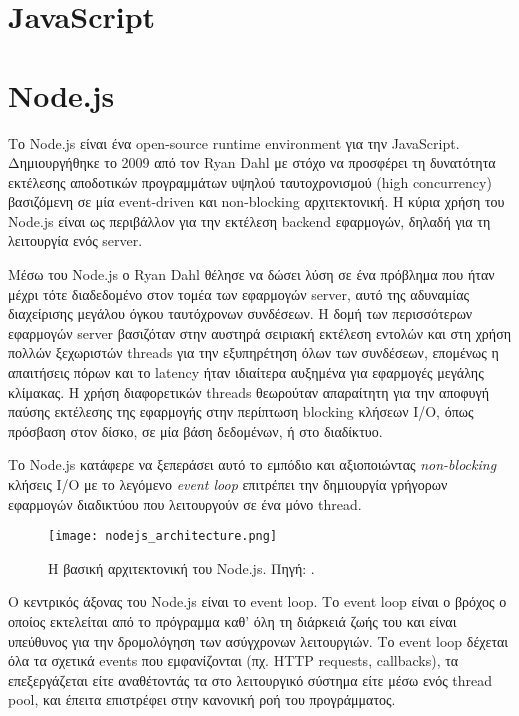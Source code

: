 \documentclass[../thesis.tex]{subfiles}
\begin{document}
\section{JavaScript}


\section{Node.js}

Το Node.js είναι ένα open-source runtime environment για την JavaScript.
Δημιουργήθηκε το 2009 από τον Ryan Dahl με στόχο να προσφέρει τη δυνατότητα εκτέλεσης αποδοτικών προγραμμάτων υψηλού ταυτοχρονισμού (high concurrency) βασιζόμενη σε μία event-driven και non-blocking αρχιτεκτονική\cite{node_presentation,node_slides}.
Η κύρια χρήση του Node.js είναι ως περιβάλλον για την εκτέλεση backend εφαρμογών, δηλαδή για τη λειτουργία ενός server.

\bigskip

Μέσω του Node.js ο Ryan Dahl θέλησε να δώσει λύση σε ένα πρόβλημα που ήταν μέχρι τότε διαδεδομένο στον τομέα των εφαρμογών server, αυτό της αδυναμίας διαχείρισης μεγάλου όγκου ταυτόχρονων συνδέσεων.
Η δομή των περισσότερων εφαρμογών server βασιζόταν στην αυστηρά σειριακή εκτέλεση εντολών και στη χρήση πολλών ξεχωριστών threads για την εξυπηρέτηση όλων των συνδέσεων, επομένως η απαιτήσεις πόρων και το latency ήταν ιδιαίτερα αυξημένα για εφαρμογές μεγάλης κλίμακας.
Η χρήση διαφορετικών threads θεωρούταν απαραίτητη για την αποφυγή παύσης εκτέλεσης της εφαρμογής στην περίπτωση blocking κλήσεων I/O, όπως πρόσβαση στον δίσκο, σε μία βάση δεδομένων, ή στο διαδίκτυο.

Το Node.js κατάφερε να ξεπεράσει αυτό το εμπόδιο και αξιοποιώντας \textit{non-blocking} κλήσεις I/O με το λεγόμενο \textit{event loop} επιτρέπει την δημιουργία γρήγορων εφαρμογών διαδικτύου που λειτουργούν σε ένα μόνο thread.

\begin{figure}
    \texttt{[image: nodejs\_architecture.png]}
    \centering
    \caption{Η βασική αρχιτεκτονική του Node.js. Πηγή: \cite{node_architecture_diagram}.}
\end{figure}

Ο κεντρικός άξονας του Node.js είναι το event loop.
Το event loop είναι ο βρόχος ο οποίος εκτελείται από το πρόγραμμα καθ' όλη τη διάρκειά ζωής του και είναι υπεύθυνος για την δρομολόγηση των ασύγχρονων λειτουργιών.
Το event loop δέχεται όλα τα σχετικά events που εμφανίζονται (πχ. HTTP requests, callbacks), τα επεξεργάζεται είτε αναθέτοντάς τα στο λειτουργικό σύστημα είτε μέσω ενός thread pool, και έπειτα επιστρέφει στην κανονική ροή του προγράμματος\cite{node_docs_eventloop}. 
\end{document}

